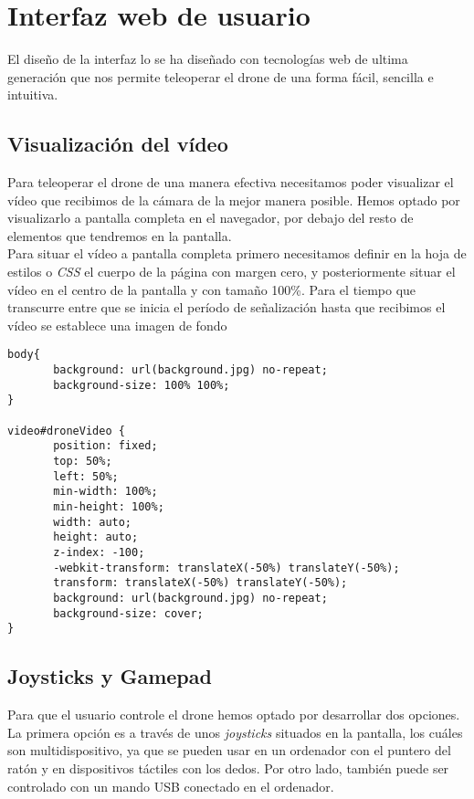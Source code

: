 \section{Interfaz web de usuario}

El diseño de la interfaz lo se ha diseñado con tecnologías web de ultima generación que nos permite teleoperar el drone de una forma fácil, sencilla e intuitiva.\\

\subsection{Visualización del vídeo}

Para teleoperar el drone de una manera efectiva necesitamos poder visualizar el vídeo que recibimos de la cámara de la mejor manera posible. Hemos optado por visualizarlo a pantalla completa en el navegador, por debajo del resto de elementos que tendremos en la pantalla.\\

Para situar el vídeo a pantalla completa primero necesitamos definir en la hoja de estilos o \emph{CSS} el cuerpo de la página con margen cero, y posteriormente situar el vídeo en el centro de la pantalla y con tamaño 100\%. Para el tiempo que transcurre entre que se inicia el período de señalización hasta que recibimos el vídeo se establece una imagen de fondo\\

\begin{lstlisting}[caption=Vídeo a pantalla completa.]
body{
       background: url(background.jpg) no-repeat;
       background-size: 100% 100%;
}

video#droneVideo { 
       position: fixed;
       top: 50%;
       left: 50%;
       min-width: 100%;
       min-height: 100%;
       width: auto;
       height: auto;
       z-index: -100;
       -webkit-transform: translateX(-50%) translateY(-50%);
       transform: translateX(-50%) translateY(-50%);
       background: url(background.jpg) no-repeat;
       background-size: cover; 
}
\end{lstlisting}

\subsection{Joysticks y Gamepad}\label{subsec:joysticks}

Para que el usuario controle el drone hemos optado por desarrollar dos opciones. La primera opción es a través de unos \emph{joysticks} situados en la pantalla, los cuáles son multidispositivo, ya que se pueden usar en un ordenador con el puntero del ratón y en dispositivos táctiles con los dedos. Por otro lado, también puede ser controlado con un mando USB conectado en el ordenador.\\

